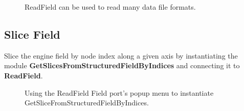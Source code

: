 \documentclass[fleqn,11pt,openany]{book}
\begin{document}
\begin{figure}[H]
\caption{ReadField can be used to read many data file formats.}
\label{fig:readfieldtype}
\end{figure}

\subsection{Slice Field}\label{slice}

Slice the engine field by node index along a given axis by instantiating the module
\textbf{GetSlicesFromStructuredFieldByIndices} and connecting it to \textbf{ReadField}.

\begin{figure}[H]
\caption{Using the ReadField Field port's popup menu to instantiate GetSliceFromStructuredFieldByIndices.}
\label{fig:slicemod}
\end{figure}
\end{document}
